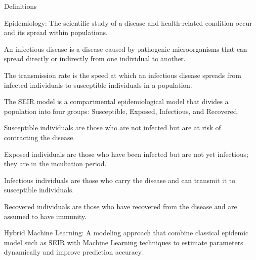 \documentclass{beamer}
\begin{document}
\begin{frame}[allowframebreaks]{Definitions}

\begin{definition}
Epidemiology: The scientific study of a disease and health-related condition occur and its spread within populations.
\end{definition}

\begin{definition}
An infectious disease is a disease caused by pathogenic microorganisms that can spread directly or indirectly from one individual to another.
\end{definition}

\begin{definition}
The transmission rate is the speed at which an infectious disease spreads from infected individuals to susceptible individuals in a population.
\end{definition}

\begin{definition}
The SEIR model is a compartmental epidemiological model that divides a population into four groups: Susceptible, Exposed, Infectious, and Recovered.
\end{definition}

\begin{definition}
Susceptible individuals are those who are not infected but are at risk of contracting the disease.
\end{definition}

\begin{definition}
Exposed individuals are those who have been infected but are not yet infectious; they are in the incubation period.
\end{definition}

\begin{definition}
Infectious individuals are those who carry the disease and can transmit it to susceptible individuals.
\end{definition}

\begin{definition}
Recovered individuals are those who have recovered from the disease and are assumed to have immunity.
\end{definition}

\begin{definition}
Hybrid Machine Learning: A modeling approach that combine classical epidemic model such as SEIR with Machine Learning techniques to estimate parameters dynamically and improve prediction accuracy.
\end{definition}


\end{frame}
\end{document}
